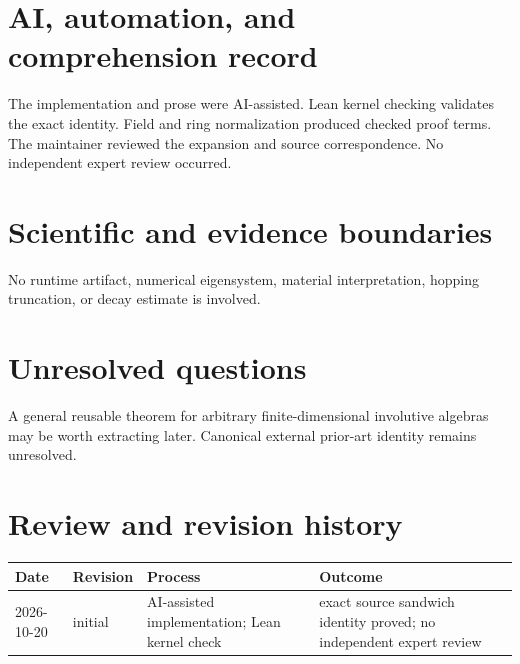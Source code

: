 \documentclass[11pt]{article}
\begin{document}
\section{AI, automation, and comprehension record}
The implementation and prose were AI-assisted. Lean kernel checking validates the exact
identity. Field and ring normalization produced checked proof terms. The maintainer
reviewed the expansion and source correspondence. No independent expert review occurred.

\section{Scientific and evidence boundaries}
No runtime artifact, numerical eigensystem, material interpretation, hopping truncation,
or decay estimate is involved.

\section{Unresolved questions}
A general reusable theorem for arbitrary finite-dimensional involutive algebras may be
worth extracting later. Canonical external prior-art identity remains unresolved.

\section{Review and revision history}
\begin{tabularx}{\textwidth}{@{}lllX@{}}\toprule
Date & Revision & Process & Outcome \\
\midrule
2026-10-20 & initial & AI-assisted implementation; Lean kernel check & exact source sandwich identity proved; no independent expert review \\
\bottomrule\end{tabularx}
\end{document}
